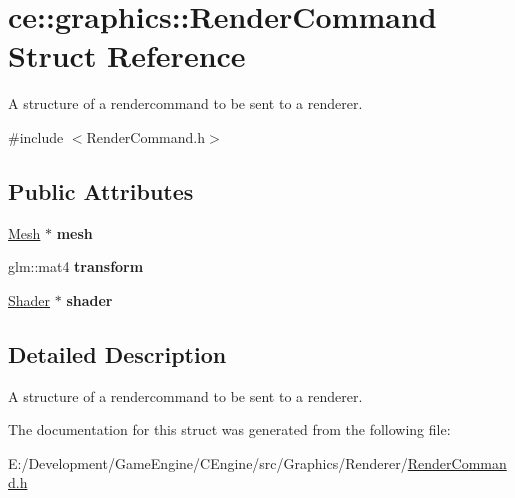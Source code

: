 \hypertarget{structce_1_1graphics_1_1_render_command}{}\section{ce\+:\+:graphics\+:\+:Render\+Command Struct Reference}
\label{structce_1_1graphics_1_1_render_command}


A structure of a rendercommand to be sent to a renderer.  




{\ttfamily \#include $<$Render\+Command.\+h$>$}

\subsection*{Public Attributes}
\begin{DoxyCompactItemize}
\item 
\mbox{\label{structce_1_1graphics_1_1_render_command_aea0982beaba0aecd4bc10f0e9f84d741}} 
\hyperlink{classce_1_1graphics_1_1_mesh}{Mesh} $\ast$ {\bfseries mesh}
\item 
\mbox{\label{structce_1_1graphics_1_1_render_command_a917fc9ebe6d75b747bac29e70a7fad3c}} 
glm\+::mat4 {\bfseries transform}
\item 
\mbox{\label{structce_1_1graphics_1_1_render_command_a90d36894ca0b20aa92de41b2887f421f}} 
\hyperlink{classce_1_1graphics_1_1_shader}{Shader} $\ast$ {\bfseries shader}
\end{DoxyCompactItemize}


\subsection{Detailed Description}
A structure of a rendercommand to be sent to a renderer. 

The documentation for this struct was generated from the following file\+:\begin{DoxyCompactItemize}
\item 
E\+:/\+Development/\+Game\+Engine/\+C\+Engine/src/\+Graphics/\+Renderer/\hyperlink{_render_command_8h}{Render\+Command.\+h}\end{DoxyCompactItemize}
